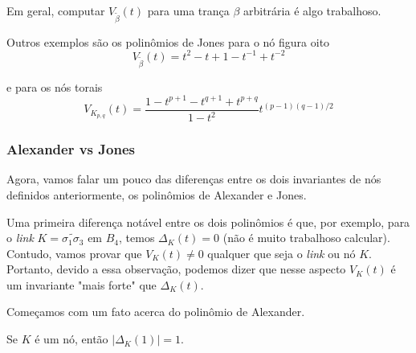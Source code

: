 	\par\vspace{0.3cm} Em geral, computar $V_{\widetilde{\beta}}(t)$ para uma trança $\beta$ arbitrária é algo trabalhoso.
	\par\vspace{0.3cm} Outros exemplos são os polinômios de Jones para o nó figura oito 
	\begin{equation*}
	V_{\widetilde{\beta}}(t) = t^2 - t + 1 - t^{-1} + t^{-2}  
	\end{equation*}
	\par\vspace{0.3cm} e para os nós torais
	\begin{equation*}
	V_{K_{p,q}}(t) = \frac{1-t^{p+1}-t^{q+1} + t^{p+q}}{1-t^2}t^{(p-1)(q-1)/2}
	\end{equation*}
	\subsubsection{Alexander vs Jones}
	\hspace{12pt} Agora, vamos falar um pouco das diferenças entre os dois invariantes de nós definidos anteriormente, os polinômios de Alexander e Jones.
	\par\vspace{0.3cm} Uma primeira diferença notável entre os dois polinômios é que, por exemplo, para o \textit{link} $K = \widetilde{\sigma_1\sigma_3}$ em $B_4$, temos $\Delta_K(t) = 0$ (não é muito trabalhoso calcular). Contudo, vamos provar que $V_K(t)\neq 0$ qualquer que seja o \textit{link} ou nó $K$. Portanto, devido a essa observação, podemos dizer que nesse aspecto $V_K(t)$ é um invariante "mais forte" que $\Delta_K(t)$. 
	\par\vspace{0.3cm} Começamos com um fato acerca do polinômio de Alexander.
	\begin{prop}
		\label{polinomio de Alexander para t=1}
		Se $K$ é um nó, então $|\Delta_K(1)|=1$.
	\end{prop}
